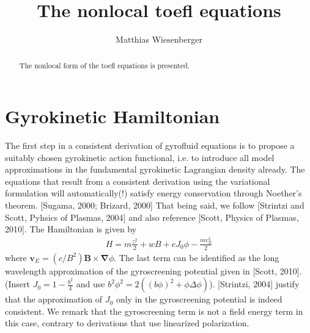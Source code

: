 \documentclass[a4paper,12pt]{scrartcl}
\title{The nonlocal toefl equations}
\author{Matthias Wiesenberger}
\renewcommand{\vec}[1]{{\mathbf{#1}}}
\begin{document}
\maketitle
\begin{abstract}
    The nonlocal form of the toefl equations is presented.
\end{abstract}
\section{Gyrokinetic Hamiltonian}
The first step in a consistent derivation of gyrofluid equations
is to propose a suitably chosen
gyrokinetic action functional, i.e. to introduce all model approximations 
in the fundamental gyrokinetic Lagrangian density already. The equations that
result from a consistent derivation using 
the variational formulation will automatically(!) satisfy 
energy conservation through Noether's theorem. [Sugama, 2000; Brizard, 2000]
That being said, 
we follow [Strintzi and Scott, Pyhsics of Plasmas, 2004] and also reference
[Scott, Physics of Plasmas, 2010]. 
The Hamiltonian is given by
\begin{align}
    H = m\frac{z^2}{2} + wB+eJ_0\phi- \frac{mv_E^2}{2}
    \label{eq:hamiltonian}
\end{align}
where $\vec v_E= (c/B^2)\vec B \times \vec\nabla \phi$. The last term can be 
identified as the 
long wavelength approximation of the gyroscreening potential given in [Scott, 2010].
(Insert $J_0 = 1-\frac{b^2}{4}$ and use $b^2\phi^2 = 2\left(  ( b\phi)^2 + \phi\Delta \phi\right)$).
[Strintzi, 2004] justify that the approximation of $J_0$ only in the 
gyroscreening potential is indeed consistent. We remark that the gyroscreening
term is not a field energy term in this case, contrary to derivations that 
use linearized polarization. 
\end{document}
